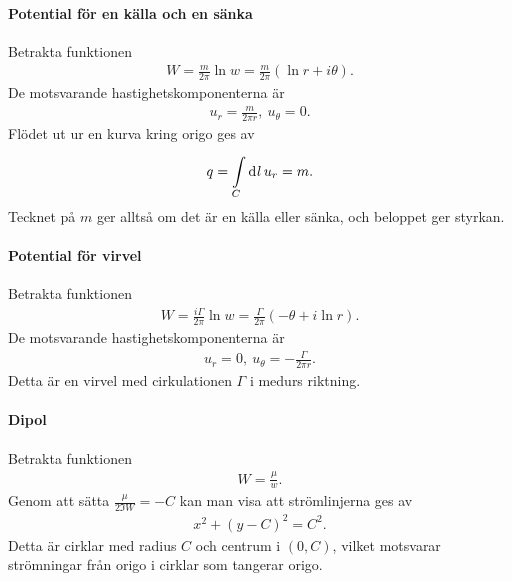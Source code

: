 \paragraph{Potential för en källa och en sänka}
Betrakta funktionen
\begin{align*}
	W = \frac{m}{2\pi}\ln{w} = \frac{m}{2\pi}(\ln{r} + i\theta).
\end{align*}
De motsvarande hastighetskomponenterna är
\begin{align*}
	u_{r} = \frac{m}{2\pi r},\ u_{\theta} = 0.
\end{align*}
Flödet ut ur en kurva kring origo ges av
\begin{align*}
	q = \int\limits_{C}^{}\dd[]{l}u_{r} = m.
\end{align*}
Tecknet på $m$ ger alltså om det är en källa eller sänka, och beloppet ger styrkan.

\paragraph{Potential för virvel}
Betrakta funktionen
\begin{align*}
	W = \frac{i\Gamma}{2\pi}\ln{w} = \frac{\Gamma}{2\pi}(-\theta + i\ln{r}).
\end{align*}
De motsvarande hastighetskomponenterna är
\begin{align*}
	u_{r} = 0,\ u_{\theta} = -\frac{\Gamma}{2\pi r}.
\end{align*}
Detta är en virvel med cirkulationen $\Gamma$ i medurs riktning.

\paragraph{Dipol}
Betrakta funktionen
\begin{align*}
	W = \frac{\mu}{w}.
\end{align*}
Genom att sätta $\frac{\mu}{2\Im{W}} = -C$ kan man visa att strömlinjerna ges av
\begin{align*}
	x^{2} + (y - C)^{2} = C^{2}.
\end{align*}
Detta är cirklar med radius $C$ och centrum i $(0, C)$, vilket motsvarar strömningar från origo i cirklar som tangerar origo.

